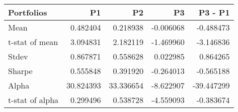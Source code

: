 \begin{tabular}{lrrrr}
\toprule
Portfolios & P1 & P2 & P3 & P3 - P1 \\
\midrule
Mean & 0.482404 & 0.218938 & -0.006068 & -0.488473 \\
t-stat of mean & 3.094831 & 2.182119 & -1.469960 & -3.146836 \\
Stdev & 0.867871 & 0.558628 & 0.022985 & 0.864265 \\
Sharpe & 0.555848 & 0.391920 & -0.264013 & -0.565188 \\
Alpha & 30.824393 & 33.336654 & -8.622907 & -39.447299 \\
t-stat of alpha & 0.299496 & 0.538728 & -4.559093 & -0.383674 \\
\bottomrule
\end{tabular}

